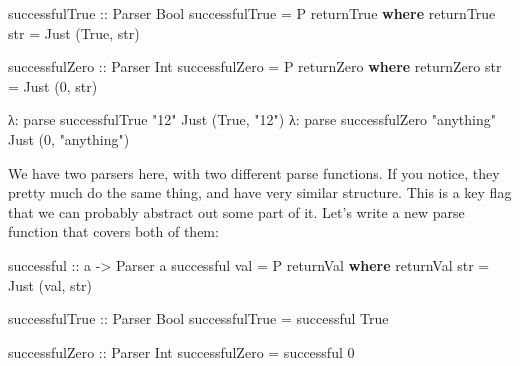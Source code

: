 \documentclass[]{article}
\newenvironment{Shaded}{}{}
\newcommand{\DataTypeTok}[1]{\textcolor[rgb]{0.56,0.13,0.00}{#1}}
\newcommand{\DecValTok}[1]{\textcolor[rgb]{0.25,0.63,0.44}{#1}}
\newcommand{\KeywordTok}[1]{\textcolor[rgb]{0.00,0.44,0.13}{\textbf{#1}}}
\newcommand{\NormalTok}[1]{#1}
\newcommand{\OperatorTok}[1]{\textcolor[rgb]{0.40,0.40,0.40}{#1}}
\newcommand{\OtherTok}[1]{\textcolor[rgb]{0.00,0.44,0.13}{#1}}
\newcommand{\StringTok}[1]{\textcolor[rgb]{0.25,0.44,0.63}{#1}}
\begin{document}
\begin{Shaded}
\begin{Highlighting}[]
\OtherTok{successfulTrue ::} \DataTypeTok{Parser} \DataTypeTok{Bool}
\NormalTok{successfulTrue }\OtherTok{=} \DataTypeTok{P}\NormalTok{ returnTrue}
    \KeywordTok{where}
\NormalTok{        returnTrue str }\OtherTok{=} \DataTypeTok{Just}\NormalTok{ (}\DataTypeTok{True}\NormalTok{, str)}

\OtherTok{successfulZero ::} \DataTypeTok{Parser} \DataTypeTok{Int}
\NormalTok{successfulZero }\OtherTok{=} \DataTypeTok{P}\NormalTok{ returnZero}
    \KeywordTok{where}
\NormalTok{        returnZero str }\OtherTok{=} \DataTypeTok{Just}\NormalTok{ (}\DecValTok{0}\NormalTok{, str)}
\end{Highlighting}
\end{Shaded}

\begin{Shaded}
\begin{Highlighting}[]
\NormalTok{λ}\OperatorTok{:}\NormalTok{ parse successfulTrue }\StringTok{"12"}
\DataTypeTok{Just}\NormalTok{ (}\DataTypeTok{True}\NormalTok{, }\StringTok{"12"}\NormalTok{)}
\NormalTok{λ}\OperatorTok{:}\NormalTok{ parse successfulZero }\StringTok{"anything"}
\DataTypeTok{Just}\NormalTok{ (}\DecValTok{0}\NormalTok{, }\StringTok{"anything"}\NormalTok{)}
\end{Highlighting}
\end{Shaded}

We have two parsers here, with two different parse functions. If you notice,
they pretty much do the same thing, and have very similar structure. This is a
key flag that we can probably abstract out some part of it. Let's write a new
parse function that covers both of them:

\begin{Shaded}
\begin{Highlighting}[]
\OtherTok{successful ::}\NormalTok{ a }\OtherTok{{-}>} \DataTypeTok{Parser}\NormalTok{ a}
\NormalTok{successful val }\OtherTok{=} \DataTypeTok{P}\NormalTok{ returnVal}
    \KeywordTok{where}
\NormalTok{        returnVal str }\OtherTok{=} \DataTypeTok{Just}\NormalTok{ (val, str)}

\OtherTok{successfulTrue ::} \DataTypeTok{Parser} \DataTypeTok{Bool}
\NormalTok{successfulTrue }\OtherTok{=}\NormalTok{ successful }\DataTypeTok{True}

\OtherTok{successfulZero ::} \DataTypeTok{Parser} \DataTypeTok{Int}
\NormalTok{successfulZero }\OtherTok{=}\NormalTok{ successful }\DecValTok{0}
\end{Highlighting}
\end{Shaded}
\end{document}
